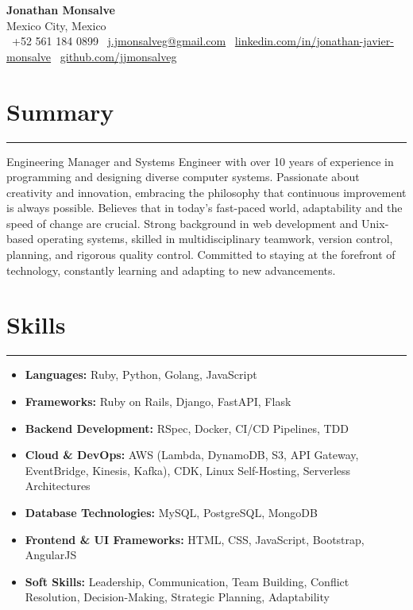 \documentclass[a4paper,10pt]{article}
\begin{document}
\begin{center}
    \textbf{\LARGE Jonathan Monsalve} \\[0.5em]
    Mexico City, Mexico \\
    \faPhone \ +52 561 184 0899 \hspace{1em}
    \faEnvelope \ \href{mailto:j.jmonsalveg@gmail.com}{j.jmonsalveg@gmail.com} \hspace{1em}
    \faLinkedin \ \href{http://linkedin.com/in/jonathan-javier-monsalve}{linkedin.com/in/jonathan-javier-monsalve} \hspace{1em}
    \faGithub \ \href{https://github.com/jjmonsalveg}{github.com/jjmonsalveg}
\end{center}

\vspace{0.5em}

\newcommand{\sectionline}{
    \noindent\rule{\linewidth}{0.4pt}\vspace{0.1em}
}

\section*{Summary}
\sectionline
Engineering Manager and Systems Engineer with over 10 years of experience in programming and designing diverse computer systems. Passionate about creativity and innovation, embracing the philosophy that continuous improvement is always possible. Believes that in today's fast-paced world, adaptability and the speed of change are crucial. Strong background in web development and Unix-based operating systems, skilled in multidisciplinary teamwork, version control, planning, and rigorous quality control. Committed to staying at the forefront of technology, constantly learning and adapting to new advancements.

\section*{Skills}
\sectionline
\vspace{-1em}
\begin{itemize}[leftmargin=0.5cm]
    \item \textbf{Languages:} Ruby, Python, Golang, JavaScript
    \item \textbf{Frameworks:} Ruby on Rails, Django, FastAPI, Flask
    \item \textbf{Backend Development:} RSpec, Docker, CI/CD Pipelines, TDD
    \item \textbf{Cloud \& DevOps:} AWS (Lambda, DynamoDB, S3, API Gateway, EventBridge, Kinesis, Kafka), CDK, Linux Self-Hosting, Serverless Architectures
    \item \textbf{Database Technologies:} MySQL, PostgreSQL, MongoDB
    \item \textbf{Frontend \& UI Frameworks:} HTML, CSS, JavaScript, Bootstrap, AngularJS
    \item \textbf{Soft Skills:} Leadership, Communication, Team Building, Conflict Resolution, Decision-Making, Strategic Planning, Adaptability
\end{itemize}
\end{document}
